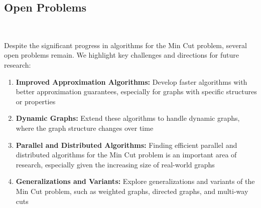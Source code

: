 \documentclass[11pt]{article}
\theoremstyle{plain}
\begin{document}


\subsection{Open Problems}\

Despite the significant progress in algorithms for the Min Cut problem, several open problems remain. We highlight key challenges and directions for future research:
\begin{enumerate}
    \item \textbf{Improved Approximation Algorithms:} Develop faster algorithms with better approximation guarantees, especially for graphs with specific structures or properties
    \item \textbf{Dynamic Graphs:} Extend these algorithms to handle dynamic graphs, where the graph structure changes over time
    \item \textbf{Parallel and Distributed Algorithms:} Finding efficient parallel and distributed algorithms for the Min Cut problem is an important area of research, especially given the increasing size of real-world graphs
    \item \textbf{Generalizations and Variants:} Explore generalizations and variants of the Min Cut problem, such as weighted graphs, directed graphs, and multi-way cuts
\end{enumerate}
\end{document}
